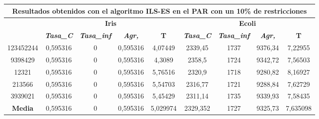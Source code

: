 \documentclass[12pt, spanish]{article}
\begin{document}
\begin{table}[H]
\begin{tabular}{|c|c|c|c|c|c|c|c|c|}
\hline
\multicolumn{9}{|c|}{\textbf{Resultados obtenidos con el algoritmo ILS-ES en el PAR con un 10\% de restricciones}}                                                                                                \\ \hline
\multirow{2}{*}{} & \multicolumn{4}{c|}{\textbf{Iris}}                                                            & \multicolumn{4}{c|}{\textbf{Ecoli}}                                                           \\ \cline{2-9} 
                  & \textit{\textbf{Tasa\_C}} & \textit{\textbf{Tasa\_inf}} & \textit{\textbf{Agr,}} & \textbf{T} & \textit{\textbf{Tasa\_C}} & \textit{\textbf{Tasa\_inf}} & \textit{\textbf{Agr,}} & \textbf{T} \\ \hline
123452244         & 0,595316                  & 0                           & 0,595316               & 4,07449    & 2339,45                   & 1737                        & 9376,34                & 7,22955    \\ \hline
9398429           & 0,595316                  & 0                           & 0,595316               & 4,3089     & 2358,5                    & 1724                        & 9342,72                & 7,56503    \\ \hline
12321             & 0,595316                  & 0                           & 0,595316               & 5,76516    & 2320,9                    & 1718                        & 9280,82                & 8,16927    \\ \hline
213566            & 0,595316                  & 0                           & 0,595316               & 5,54703    & 2316,77                   & 1721                        & 9288,84                & 7,62729    \\ \hline
3939021           & 0,595316                  & 0                           & 0,595316               & 5,45429    & 2311,14                   & 1735                        & 9339,93                & 7,58435    \\ \hline
\textbf{Media}    & 0,595316                  & 0                           & 0,595316               & 5,029974   & 2329,352                  & 1727                        & 9325,73                & 7,635098   \\ \hline
\end{tabular}
\end{table}
\end{document}
